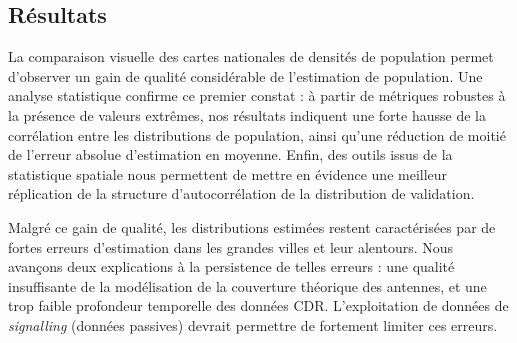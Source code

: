 \subsection*{Résultats}

La comparaison visuelle des cartes nationales de densités de population permet d'observer un gain de qualité considérable de l'estimation de population. Une analyse statistique confirme ce premier constat : à partir de métriques robustes à la présence de valeurs extrêmes, nos résultats indiquent une forte hausse de la corrélation entre les distributions de population, ainsi qu'une réduction de moitié de l'erreur absolue d'estimation en moyenne. Enfin, des outils issus de la statistique spatiale nous permettent de mettre en évidence une meilleur réplication de la structure d'autocorrélation de la distribution de validation.

Malgré ce gain de qualité, les distributions estimées restent caractérisées par de fortes erreurs d'estimation dans les grandes villes et leur alentours. Nous avançons deux explications à la persistence de telles erreurs : une qualité insuffisante de la modélisation de la couverture théorique des antennes, et une trop faible profondeur temporelle des données CDR. L'exploitation de données de \textit{signalling} (données passives) devrait permettre de fortement limiter ces erreurs.

